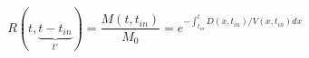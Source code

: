 \begin{equation}
R(t,\underbrace{t-t_{in}}_{t'}) = \frac{M(t,t_{in})}{M_0} = e^{-\int_{t_{in}}^t D(x,t_{in})/V(x,t_{in}) dx}
\end{equation}